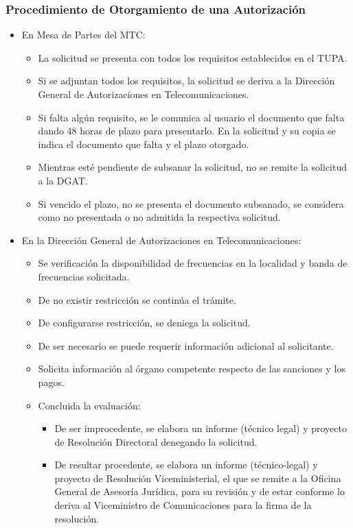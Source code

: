 \documentclass[a4paper]{IEEEtran} %
\begin{document}
\subsubsection{Procedimiento de Otorgamiento de una Autorización}
\begin{itemize}
	\item En Mesa de Partes del MTC:  
	\begin{itemize}
		\item La  solicitud  se  presenta  con  todos  los 
		requisitos establecidos en el TUPA. 
		\item Si  se  adjuntan  todos  los  requisitos,  la 
		solicitud se deriva a la Dirección General 
		de Autorizaciones en 
		Telecomunicaciones. 
		\item Si falta algún requisito, se le comunica al 
		usuario  el  documento  que  falta  dando 
		48  horas  de  plazo  para  presentarlo.  En 
		la solicitud y su copia se indica el 
		documento que falta y el plazo 
		otorgado.
		\item Mientras  esté  pendiente  de  subsanar  la 
		solicitud,  no  se  remite  la  solicitud  a  la 
		DGAT.
		\item  Si  vencido  el  plazo,  no  se  presenta  el 
		documento subsanado, se considera 
		como  no  presentada  o  no  admitida  la 
		respectiva solicitud.
	\end{itemize}
	\item En  la  Dirección  General  de  Autorizaciones  en 
	Telecomunicaciones:
	\begin{itemize}
		\item Se verificación la disponibilidad de 
		frecuencias  en  la  localidad  y  banda  de 
		frecuencias solicitada.
		\item De  no  existir  restricción  se  continúa  el 
		trámite.
		\item  De  configurarse  restricción,  se  deniega 
		la solicitud. 
		\item De ser necesario se puede requerir 
		información adicional al solicitante.
		\item Solicita información al órgano 
		competente  respecto  de  las  sanciones  y 
		los pagos. 
		\item Concluida la evaluación:
		\begin{itemize}
			\item De ser improcedente, se elabora un informe 
			(técnico legal) y proyecto de Resolución 
			Directoral denegando la solicitud. 
			\item De resultar procedente, se elabora un 
			informe (técnico-legal) y proyecto de 
			Resolución  Viceministerial,  el  que  se  remite 
			a  la  Oficina  General  de  Asesoría  Jurídica, 
			para  su  revisión  y  de  estar  conforme  lo 
			deriva  al  Viceministro  de  Comunicaciones 
			para la firma de la resolución. 
		\end{itemize}
	\end{itemize}
\end{itemize}
\end{document}
